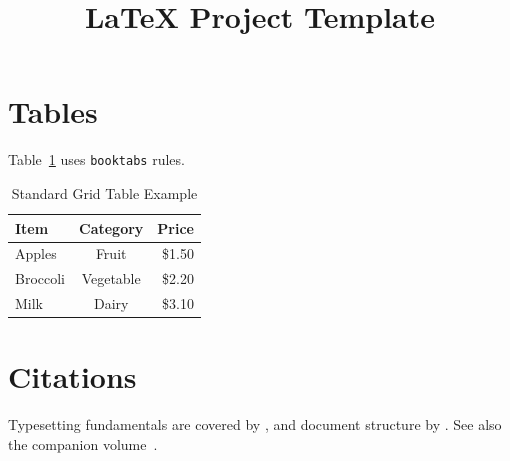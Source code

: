 \documentclass{article}
\title{LaTeX Project Template}
\author{}
\date{}
\begin{document}
\maketitle

\section{Tables}

Table~\ref{tab:standard_table} uses \texttt{booktabs} rules.

\begin{table}[ht]
  \centering
  \caption{Standard Grid Table Example}
  \label{tab:standard_table}
  \begin{tabular}{lcr}
    \toprule
    \textbf{Item} & \textbf{Category} & \textbf{Price} \\
    \midrule
    Apples        &       Fruit       &         \$1.50 \\
    Broccoli      &     Vegetable     &         \$2.20 \\
    Milk          &       Dairy       &         \$3.10 \\
    \bottomrule
  \end{tabular}
\end{table}

\section{Citations}

Typesetting fundamentals are covered by \textcite{knuth1984}, and document
structure by \textcite{lamport1994}. See also the companion
volume~\parencite{goossens1994}.

\printbibliography
\end{document}
